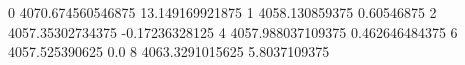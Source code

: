 0 4070.674560546875 13.149169921875
1 4058.130859375 0.60546875
2 4057.35302734375 -0.17236328125
4 4057.988037109375 0.462646484375
6 4057.525390625 0.0
8 4063.3291015625 5.8037109375
